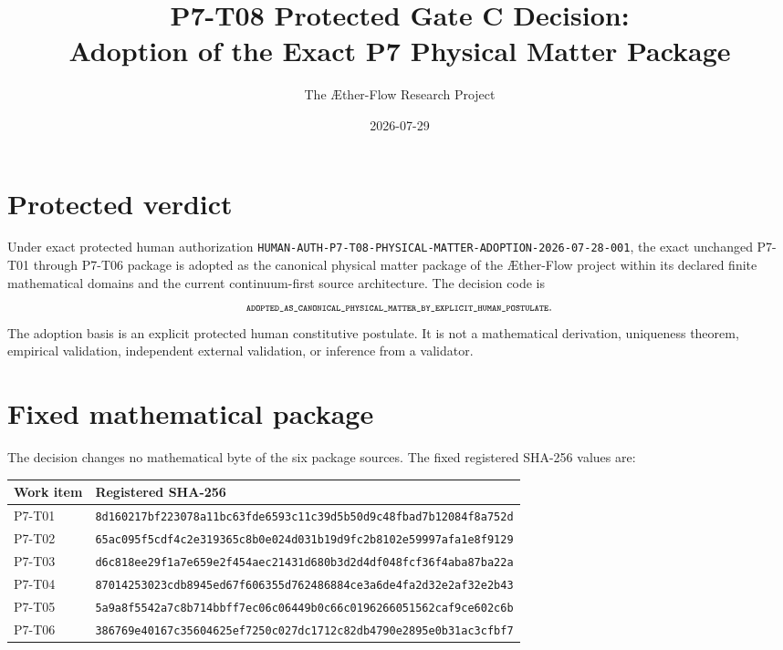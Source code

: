 \documentclass[11pt]{article}
\title{P7-T08 Protected Gate C Decision:\\
Adoption of the Exact P7 Physical Matter Package}
\author{The \AE ther-Flow Research Project}
\date{2026-07-29}
\newcommand{\Verdict}{{\scriptsize\texttt{ADOPTED\_AS\_CANONICAL\_PHYSICAL\_MATTER\_BY\_EXPLICIT\_HUMAN\_POSTULATE}}}
\begin{document}
\sloppy
\maketitle

\section{Protected verdict}

Under exact protected human authorization
\nolinkurl{HUMAN-AUTH-P7-T08-PHYSICAL-MATTER-ADOPTION-2026-07-28-001},
the exact unchanged P7-T01 through P7-T06 package is adopted as the canonical
physical matter package of the \AE ther-Flow project within its declared
finite mathematical domains and the current continuum-first source
architecture.  The decision code is
\[
  \Verdict .
\]
The adoption basis is an explicit protected human constitutive postulate.
It is not a mathematical derivation, uniqueness theorem, empirical
validation, independent external validation, or inference from a validator.

\section{Fixed mathematical package}

The decision changes no mathematical byte of the six package sources.  The
fixed registered SHA-256 values are:

\begin{longtable}{>{\raggedright\arraybackslash}p{}
                  >{\raggedright\arraybackslash}p{}}
\toprule
Work item & Registered SHA-256\\
\midrule
P7-T01 & {\scriptsize\texttt{8d160217bf223078a11bc63fde6593c11c39d5b50d9c48fbad7b12084f8a752d}}\\
P7-T02 & {\scriptsize\texttt{65ac095f5cdf4c2e319365c8b0e024d031b19d9fc2b8102e59997afa1e8f9129}}\\
P7-T03 & {\scriptsize\texttt{d6c818ee29f1a7e659e2f454aec21431d680b3d2d4df048fcf36f4aba87ba22a}}\\
P7-T04 & {\scriptsize\texttt{87014253023cdb8945ed67f606355d762486884ce3a6de4fa2d32e2af32e2b43}}\\
P7-T05 & {\scriptsize\texttt{5a9a8f5542a7c8b714bbff7ec06c06449b0c66c0196266051562caf9ce602c6b}}\\
P7-T06 & {\scriptsize\texttt{386769e40167c35604625ef7250c027dc1712c82db4790e2895e0b31ac3cfbf7}}\\
\bottomrule
\end{longtable}
\end{document}
